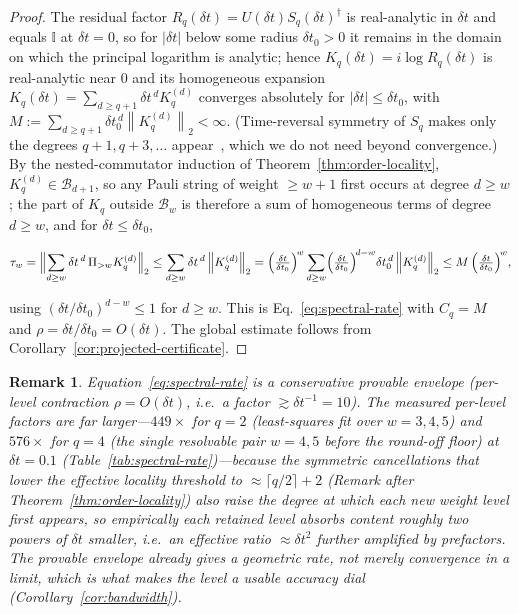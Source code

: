 \documentclass[aps,prxquantum,reprint,superscriptaddress,nofootinbib,amsmath,amssymb]{revtex4-2}
\newcommand{\norm}[1]{\left\lVert #1 \right\rVert}
\newcommand{\abs}[1]{\left\lvert #1 \right\rvert}
\newcommand{\id}{\mathbb{I}}
\newcommand{\cB}{\mathcal{B}}
\newcommand{\dt}{\delta t}
\newtheorem{remark}{Remark}
\begin{document}
\begin{proof}
The residual factor $R_q(\dt)=U(\dt)S_q(\dt)^\dagger$ is real-analytic in $\dt$ and equals $\id$ at $\dt=0$, so for $\abs{\dt}$ below some radius $\dt_0>0$ it remains in the domain on which the principal logarithm is analytic; hence $K_q(\dt)=i\log R_q(\dt)$ is real-analytic near $0$ and its homogeneous expansion $K_q(\dt)=\sum_{d\geq q+1}\dt^{\,d}K_q^{(d)}$ converges absolutely for $\abs{\dt}\leq\dt_0$, with $M:=\sum_{d\geq q+1}\dt_0^{\,d}\norm{K_q^{(d)}}_2<\infty$. (Time-reversal symmetry of $S_q$ makes only the degrees $q+1,q+3,\dots$ appear~\cite{blanes2009}, which we do not need beyond convergence.) By the nested-commutator induction of Theorem~\ref{thm:order-locality}, $K_q^{(d)}\in\cB_{d+1}$, so any Pauli string of weight $\geq w+1$ first occurs at degree $d\geq w$; the part of $K_q$ outside $\cB_w$ is therefore a sum of homogeneous terms of degree $d\geq w$, and for $\dt\leq\dt_0$,
\begin{widetext}
\begin{equation*}
    \tau_w=\Bigl\lVert\sum_{d\geq w}\dt^{\,d}\,\Pi_{>w}K_q^{(d)}\Bigr\rVert_2\leq\sum_{d\geq w}\dt^{\,d}\norm{K_q^{(d)}}_2=\Bigl(\tfrac{\dt}{\dt_0}\Bigr)^{\!w}\sum_{d\geq w}\Bigl(\tfrac{\dt}{\dt_0}\Bigr)^{\!d-w}\dt_0^{\,d}\norm{K_q^{(d)}}_2\leq M\,\Bigl(\tfrac{\dt}{\dt_0}\Bigr)^{\!w},
\end{equation*}
\end{widetext}
using $(\dt/\dt_0)^{d-w}\leq1$ for $d\geq w$. This is Eq.~\eqref{eq:spectral-rate} with $C_q=M$ and $\rho=\dt/\dt_0=O(\dt)$. The global estimate follows from Corollary~\ref{cor:projected-certificate}.
\end{proof}

\begin{remark}
Equation~\eqref{eq:spectral-rate} is a conservative provable envelope (per-level contraction $\rho=O(\dt)$, i.e.\ a factor $\gtrsim\dt^{-1}=10$). The measured per-level factors are far larger---$449\times$ for $q=2$ (least-squares fit over $w=3,4,5$) and $576\times$ for $q=4$ (the single resolvable pair $w=4,5$ before the round-off floor) at $\dt=0.1$ (Table~\ref{tab:spectral-rate})---because the symmetric cancellations that lower the effective locality threshold to $\approx\lceil q/2\rceil+2$ (Remark after Theorem~\ref{thm:order-locality}) also raise the degree at which each new weight level first appears, so empirically each retained level absorbs content roughly two powers of $\dt$ smaller, i.e.\ an effective ratio $\approx\dt^{2}$ further amplified by prefactors. The provable envelope already gives a geometric \emph{rate}, not merely convergence in a limit, which is what makes the level a usable accuracy dial (Corollary~\ref{cor:bandwidth}).
\end{remark}
\end{document}

